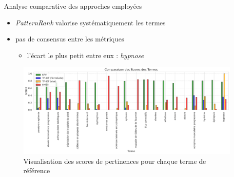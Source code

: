 \documentclass[xcolor={table,usenames,dvipsnames}]{beamer}
\let\olditem\item
\renewcommand{\item}{%
\olditem\vspace{0pt}}
\newcommand{\bolder}[1]{{\color{purple}\bfseries#1}}
\begin{document}
\begin{frame}{Analyse comparative des approches employées}
	\begin{itemize}
		\item \textit{PatternRank} valorise systématiquement les termes
		\item pas de consensus entre les métriques
		\begin{itemize}
			\item l'écart le plus petit entre eux : \textit{hypnose}
		\end{itemize}
	\end{itemize}
\begin{figure}[h]
	\includegraphics[width=\linewidth]{pic/termes_viz.png}
	\caption{Visualisation des scores de pertinences pour chaque terme de référence}
	\label{fig:ling_out_TAL}
\end{figure}
\end{frame}

\end{document}
